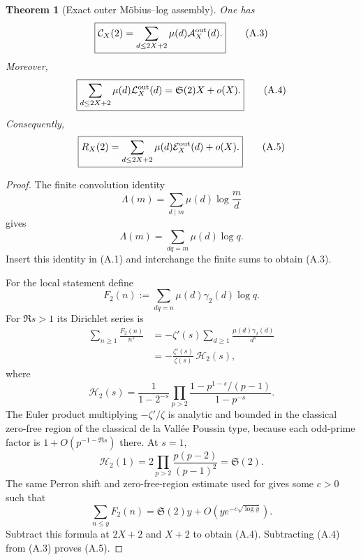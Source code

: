 \documentclass[11pt]{article}
\newtheorem{theorem}{Theorem}[section]
\theoremstyle{definition}
\theoremstyle{remark}
\begin{document}
\begin{theorem}[Exact outer M\"obius--log assembly]
\label{thm:affouter-outer-assembly}
One has
\begin{equation}
 \label{eq:affouter-actual-outer-assembly}
 \boxed{
 \mathcal C_X(2)
 =\sum_{d\le2X+2}\mu(d)\mathcal A_X^{\rm out}(d).}
 \tag{A.3}
\end{equation}
Moreover,
\begin{equation}
 \label{eq:affouter-local-outer-assembly}
 \boxed{
 \sum_{d\le2X+2}\mu(d)\mathcal L_X^{\rm out}(d)
 =\mathfrak S(2)X+o(X).}
 \tag{A.4}
\end{equation}
Consequently,
\begin{equation}
 \label{eq:affouter-residual-outer-assembly}
 \boxed{
 R_X(2)
 =\sum_{d\le2X+2}\mu(d)\mathcal E_X^{\rm out}(d)
  +o(X).}
 \tag{A.5}
\end{equation}
\end{theorem}

\begin{proof}
The finite convolution identity
\[
 \Lambda(m)
 =\sum_{d\mid m}\mu(d)\log\frac md
\]
gives
\[
 \Lambda(m)
 =\sum_{dq=m}\mu(d)\log q.
\]
Insert this identity in \textup{(A.1)} and interchange the finite sums to
obtain \textup{(A.3)}.

For the local statement define
\[
 F_2(n)
 :=\sum_{dq=n}\mu(d)\gamma_2(d)\log q.
\]
For $\Re s>1$ its Dirichlet series is
\[
 \begin{aligned}
 \sum_{n\ge1}\frac{F_2(n)}{n^s}
 &=-\zeta'(s)
   \sum_{d\ge1}\frac{\mu(d)\gamma_2(d)}{d^s}\\
 &=-\frac{\zeta'(s)}{\zeta(s)}\,\mathscr H_2(s),
 \end{aligned}
\]
where
\begin{equation}
 \label{eq:affouter-local-Euler-factor}
 \boxed{
 \mathscr H_2(s)
 =\frac1{1-2^{-s}}
  \prod_{p>2}
  \frac{1-p^{1-s}/(p-1)}{1-p^{-s}}.}
 \tag{A.6}
\end{equation}
The Euler product multiplying $-\zeta'/\zeta$ is analytic and bounded in the
classical zero-free region of the classical de la Vall\'ee Poussin type, because each odd-prime factor
is $1+O(p^{-1-\Re s})$ there.  At $s=1$,
\[
 \mathscr H_2(1)
 =2\prod_{p>2}\frac{p(p-2)}{(p-1)^2}
 =\mathfrak S(2).
\]
The same Perron shift and zero-free-region estimate used for
 gives some $c>0$ such that
\[
 \sum_{n\le y}F_2(n)
 =\mathfrak S(2)y
  +O\!\left(ye^{-c\sqrt{\log y}}\right).
\]
Subtract this formula at $2X+2$ and $X+2$ to obtain
\textup{(A.4)}.  Subtracting \textup{(A.4)} from
\textup{(A.3)} proves \textup{(A.5)}.
\end{proof}
\end{document}
